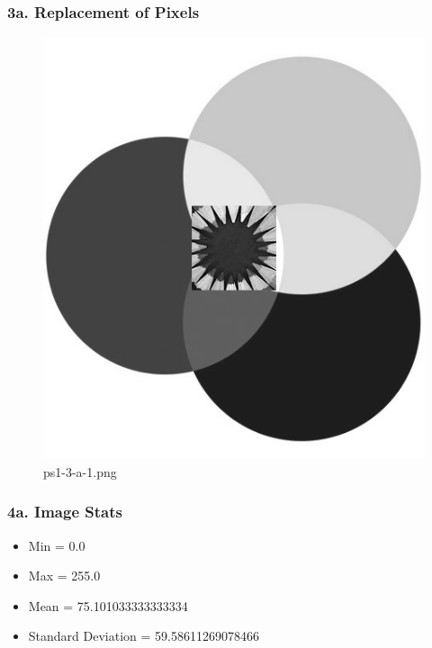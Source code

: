 	\begin{frame}
		\frametitle{3a. Replacement of Pixels}
		
		\begin{figure}[!htb]
			\centering
			\includegraphics[height=0.65\textheight]{./output/ps1-3-a-1.png}
			\caption{ps1-3-a-1.png} 
		\end{figure}	
		
	\end{frame}

	\begin{frame}[t]
		\frametitle{4a. Image Stats}
		
		\begin{LARGE}
			\begin{itemize}
				\item Min = 0.0
				\item Max = 255.0
				\item Mean = 75.101033333333334
				\item Standard Deviation = 59.58611269078466
			\end{itemize}
		\end{LARGE}
		
	\end{frame}

